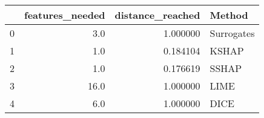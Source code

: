 \begin{tabular}{lrrl}
\toprule
{} &  features\_needed &  distance\_reached &      Method \\
\midrule
0 &              3.0 &          1.000000 &  Surrogates \\
1 &              1.0 &          0.184104 &       KSHAP \\
2 &              1.0 &          0.176619 &       SSHAP \\
3 &             16.0 &          1.000000 &        LIME \\
4 &              6.0 &          1.000000 &        DICE \\
\bottomrule
\end{tabular}
